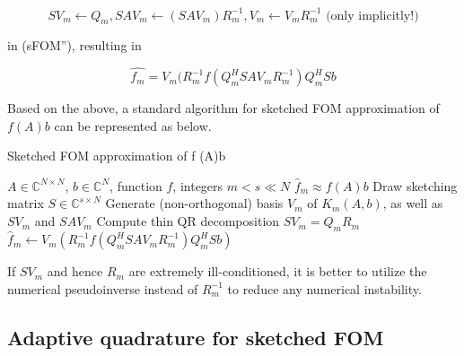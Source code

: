 \[
    SV_m \leftarrow Q_m, SAV_m \leftarrow (SAV_m)R_m^{-1}, V_m \leftarrow V_mR_m^{-1} \text{ (only implicitly!)}
\]

in (sFOM''), resulting in

\[
    \hat{f_m} = V_m(R_m^{-1}f(Q_m^{H}SAV_mR_m^{-1})Q_m^{H}Sb
    \tag{\footnotesize sFOM'''}
\]

Based on the above, a standard algorithm for sketched FOM approximation of $f(A)b$ can be represented as below.

\begin{algorithm}[H]
    \caption{Sketched FOM approximation of f (A)b\cite{41}}
    \label{alg: Sketched FOM approximation of f (A)b}
    \begin{algorithmic}[1]
        \REQUIRE $A \in \mathbb{C}^{N \times N}$, $b \in \mathbb{C}^{N}$, function $f$, integers $m < s \ll N$
        \ENSURE $\hat{f}_m \approx f(A)b$
        \STATE Draw sketching matrix $S \in \mathbb{C}^{s \times N}$
        \STATE Generate (non-orthogonal) basis $V_m$ of $K_m(A, b)$, as well as $SV_m$ and $SAV_m$
        \STATE Compute thin QR decomposition $SV_m = Q_m R_m$
        \STATE $\hat{f}_m \gets V_m \left(R_m^{-1} f \left(Q_m^H S A V_m R_m^{-1} \right) Q_m^H S b \right)$
    \end{algorithmic}
\end{algorithm}

\begin{remark}
    \label{rem:2.18}
    \cite{41}If $SV_m$ and hence $R_m$ are extremely ill-conditioned, it is better to utilize the numerical pseudoinverse instead of $R_m^{-1}$ to reduce any numerical instability.
\end{remark}

\subsection{Adaptive quadrature for sketched FOM}
\label{sec:adap_sketched_FOM}

